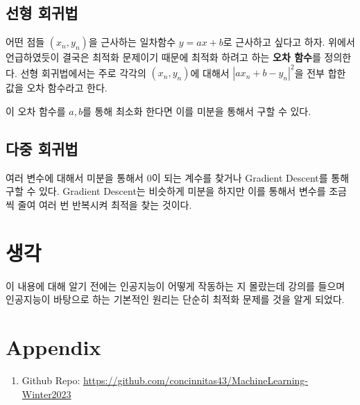 \documentclass[]{sptr_article}
\begin{document}
\subsection{선형 회귀법}

어떤 점들 $(x_n, y_n)$을 근사하는 일차함수 $y=ax+b$로 근사하고 싶다고 하자. 
위에서 언급하였듯이 결국은 최적화 문제이기 때문에 최적화 하려고 하는 \textbf{오차 함수}를 정의한다. 
선형 회귀법에서는 주로 각각의 $(x_n, y_n)$에 대해서 $|ax_n + b - y_n|^2$을 전부 합한 값을 오차 함수라고 한다.

이 오차 함수를 $a, b$를 통해 최소화 한다면 이를 미분을 통해서 구할 수 있다. 

\subsection{다중 회귀법}

여러 변수에 대해서 미분을 통해서 0이 되는 계수를 찾거나
Gradient Descent를 통해 구할 수 있다.
Gradient Descent는 비슷하게 미분을 하지만 이를 통해서 변수를 조금씩 줄여 여러 번 반복시켜 최적을 찾는 것이다.


\section{생각}

이 내용에 대해 알기 전에는 인공지능이 어떻게 작동하는 지 몰랐는데 강의를 들으며 인공지능이 바탕으로 하는 기본적인 원리는 단순히 최적화 문제를 것을 알게 되었다.


\section*{Appendix}

\begin{enumerate}
  \item Github Repo: \url{https://github.com/concinnitas43/MachineLearning-Winter2023}
\end{enumerate}

\end{document}
